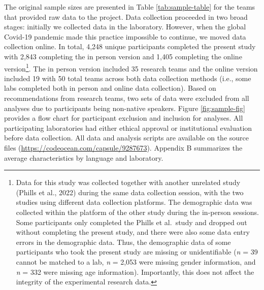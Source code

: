 \documentclass[
  man,floatsintext]{apa7}
\begin{document}
The original sample sizes are presented in Table \ref{tab:sample-table} for the teams that provided raw data to the project. Data collection proceeded in two broad stages: initially we collected data in the laboratory. However, when the global Covid-19 pandemic made this practice impossible to continue, we moved data collection online. In total, 4,248 unique participants completed the present study with 2,843 completing the in person version and 1,405 completing the online version\footnote{Data for this study was collected together with another unrelated study (Phills et al., 2022) during the same data collection session, with the two studies using different data collection platforms. The demographic data was collected within the platform of the other study during the in-person sessions. Some participants only completed the Phills et al.~study and dropped out without completing the present study, and there were also some data entry errors in the demographic data. Thus, the demographic data of some participants who took the present study are missing or unidentifiable (\emph{n} = 39 cannot be matched to a lab, \emph{n} = 2,053 were missing gender information, and \emph{n} = 332 were missing age information). Importantly, this does not affect the integrity of the experimental research data.}. The in person version included 35 research teams and the online version included 19 with 50 total teams across both data collection methods (i.e., some labs completed both in person and online data collection). Based on recommendations from research teams, two sets of data were excluded from all analyses due to participants being non-native speakers. Figure \ref{fig:sample-fig} provides a flow chart for participant exclusion and inclusion for analyses. All participating laboratories had either ethical approval or institutional evaluation before data collection. All data and analysis scripts are available on the source files (\url{https://codeocean.com/capsule/9287673}). Appendix B summarizes the average characteristics by language and laboratory.
\end{document}
